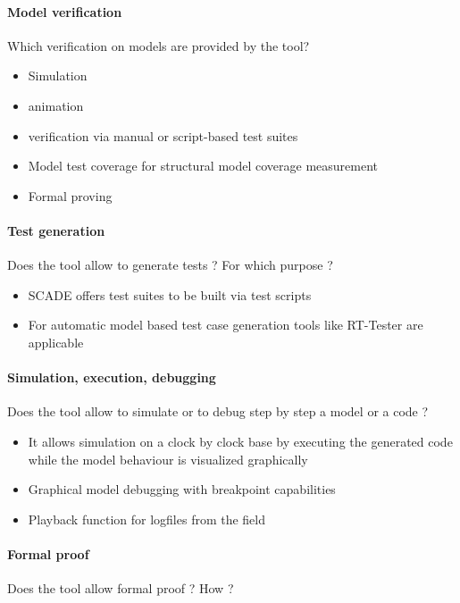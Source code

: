 \paragraph{Model verification}
Which verification on models are provided by the tool?

\begin{itemize}
	\item Simulation
	\item animation
	\item verification via manual or script-based test suites
	\item Model test coverage for structural model coverage measurement
	\item Formal proving
\end{itemize}

\paragraph{Test generation}
Does the tool allow to generate tests ? For  which purpose ?

\begin{itemize}
	\item SCADE offers test suites to be built via test scripts
	\item For automatic model based test case generation tools like RT-Tester are applicable
\end{itemize}

\paragraph{Simulation, execution, debugging}
Does the tool allow to simulate or to debug step by step a model or a code ?

\begin{itemize}
	\item It allows simulation on a clock by clock base by executing the generated code while the model behaviour is visualized graphically
	\item Graphical model debugging with breakpoint capabilities
	\item Playback function for logfiles from the field
\end{itemize}

\paragraph{Formal proof}
Does the tool allow formal proof ?  How ?

